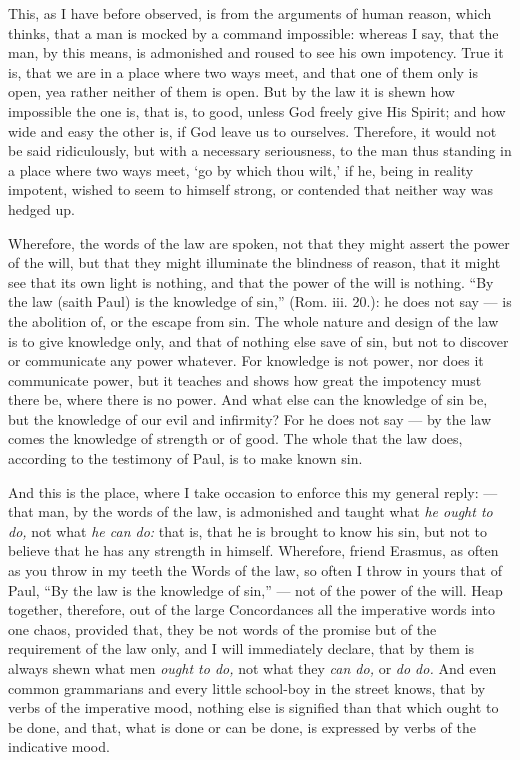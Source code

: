 This, as I have before observed, is from the arguments of human reason, which thinks, that a man is mocked by a command impossible: whereas I say, that the man, by this means, is admonished and roused to see his own impotency. True it is, that we are in a place where two ways meet, and that one of them only is open, yea rather neither of them is open. But by the law it is shewn how impossible the one is, that is, to good, unless God freely give His Spirit; and how wide and easy the other is, if God leave us to ourselves. Therefore, it would not be said ridiculously, but with a necessary seriousness, to the man thus standing in a place where two ways meet, ‘go by which thou wilt,’ if he, being in reality impotent, wished to seem to himself strong, or contended that neither way was hedged up.

Wherefore, the words of the law are spoken, not that they might assert the power of the will, but that they might illuminate the blindness of reason, that it might see that its own light is nothing, and that the power of the will is nothing. “By the law (saith Paul) is the knowledge of sin,” (Rom. iii. 20.): he does not say — is the abolition of, or the escape from sin. The whole nature and design of the law is to give knowledge only, and that of nothing else save of sin, but not to discover or communicate any power whatever. For knowledge is not power, nor does it communicate power, but it teaches and shows how great the impotency must there be, where there is no power. And what else can the knowledge of sin be, but the knowledge of our evil and infirmity? For he does not say — by the law comes the knowledge of strength or of good. The whole that the law does, according to the testimony of Paul, is to make known sin.

And this is the place, where I take occasion to enforce this my general reply: — that man, by the words of the law, is admonished and taught what \emph{he ought to do, }not what \emph{he can do: }that is, that he is brought to know his sin, but not to believe that he has any strength in himself. Wherefore, friend Erasmus, as often as you throw in my teeth the Words of the law, so often I throw in yours that of Paul, “By the law is the knowledge of sin,” — not of the power of the will. Heap together, therefore, out of the large Concordances all the imperative words into one chaos, provided that, they be not words of the promise but of the requirement of the law only, and I will immediately declare, that by them is always shewn what men \emph{ought to do, }not what they \emph{can do, }or \emph{do do. }And even common grammarians and every little school-boy in the street knows, that by verbs of the imperative mood, nothing else is signified than that which ought to be done, and that, what is done or can be done, is expressed by verbs of the indicative mood.

